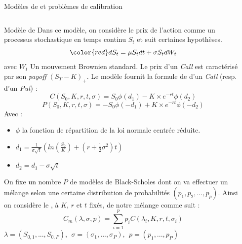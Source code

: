 \documentclass[final]{beamer}
\newlength{\sepwid}
\newlength{\onecolwid}
\newlength{\twocolwid}
\begin{document}
\begin{frame}[t]
\begin{columns}[t]
\begin{column}{\sepwid}\end{column} %

\begin{column}{\twocolwid} %
\vspace{-1cm}
\begin{block}{Modèles de  et problèmes de calibration}

\begin{columns}[t,totalwidth=\twocolwid] %

\begin{column}{\onecolwid} %


\begin{alertblock}{Modèle de }
  Dans ce modèle, on considère le prix de l'action comme un processus stochastique en temps continu $S_t$ et suit certaines hypothèses. \newline
  {
  \[ {\color{red} dS_t = \mu S_t dt + \sigma S_t dW_t} \]}
avec $W_t$ Un mouvement Brownien standard.
\newline
Le prix d'un \textit{Call} est caractérisé par son \textit{payoff} $(S_T - K)_{+}$. \newline
Le modèle fournit la formule de  d'un \textit{Call} (resp. d'un \textit{Put}) :
$$ C(S_0,K,r,t,\sigma) = S_0 \phi(d_1)-K \times e^{-rt} \phi(d_2) $$
$$ P(S_0,K,r,t,\sigma) = -S_0 \phi(-d_1)+K \times e^{-rt} \phi(-d_2) $$
Avec : \begin{itemize}
\item $\phi$ la fonction de répartition de la loi normale centrée réduite.
\item $d_1 = \frac{1}{\sigma \sqrt{t}} (ln(\frac{S_0}{K})+(r+\frac{1}{2}\sigma^2)t) $
\item $d_2 = d_1 - \sigma \sqrt{t}$
\end{itemize}
\end{alertblock}
On fixe un nombre $P$ de modèles de Black-Scholes dont on va effectuer un mélange selon une certaine distribution de probabilités $(p_1,p_2,...,p_p)$.
\newline
Ainsi on considère le , à $K$, $r$ et $t$ fixés, de notre mélange comme suit :
$$ C_m(\lambda, \sigma, p) = \sum^p_{i=1} p_i C(\lambda_i,K,r,t,\sigma_i) $$
\vspace{-0.3cm}
$\lambda = (S_{0,1},...,S_{0,P}),\ \  \sigma = (\sigma_1,...,\sigma_P), \ \ p = (p_1,...,p_P)$


\end{column}
\end{columns}
\end{block}
\end{column}
\end{columns}
\end{frame}
\end{document}

